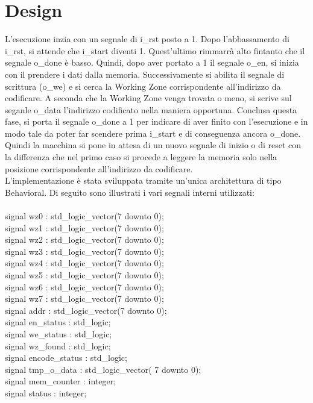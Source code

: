 \documentclass{article}
\begin{document}
\section{Design}
L'esecuzione inzia con un segnale di {\selectfont i\_rst} posto a 1. Dopo l'abbassamento di {\selectfont i\_rst}, si attende che {\selectfont i\_start} diventi 1. Quest'ultimo rimmarrà alto fintanto che il segnale {\selectfont o\_done} è basso. Quindi, dopo aver portato a 1 il segnale {\selectfont o\_en}, si inizia con il prendere i dati dalla memoria. Successivamente si abilita il segnale di scrittura ({\selectfont o\_we}) e si cerca la Working Zone corrispondente all'indirizzo da codificare. A seconda che la Working Zone venga trovata o meno, si scrive sul seganle {\selectfont o\_data} l'indirizzo codificato nella maniera opportuna. Conclusa questa fase, si porta il segnale {\selectfont o\_done} a 1 per indicare di aver finito con l'esecuzione e in modo tale da poter far scendere prima {\selectfont i\_start} e di conseguenza ancora {\selectfont o\_done}. Quindi la macchina si pone in attesa di un nuovo segnale di inizio o di reset con la differenza che nel primo caso si procede a leggere la memoria solo nella posizione corrispondente all'indirizzo da codificare.\\
L'implementazione è stata sviluppata tramite un'unica architettura di tipo Behavioral. Di seguito sono illustrati i vari segnali interni utilizzati:\\\\
{\selectfont
signal wz0 : std\_logic\_vector(7 downto 0);\\
signal wz1 : std\_logic\_vector(7 downto 0);\\
signal wz2 : std\_logic\_vector(7 downto 0);\\
signal wz3 : std\_logic\_vector(7 downto 0);\\
signal wz4 : std\_logic\_vector(7 downto 0);\\
signal wz5 : std\_logic\_vector(7 downto 0);\\
signal wz6 : std\_logic\_vector(7 downto 0);\\
signal wz7 : std\_logic\_vector(7 downto 0);\\
signal addr : std\_logic\_vector(7 downto 0);\\
signal en\_status : std\_logic;\\
signal we\_status : std\_logic;\\
signal wz\_found : std\_logic;\\
signal encode\_status : std\_logic;\\
signal tmp\_o\_data : std\_logic\_vector( 7 downto 0);\\
signal mem\_counter : integer;\\
signal status : integer;\\
}
\end{document}

